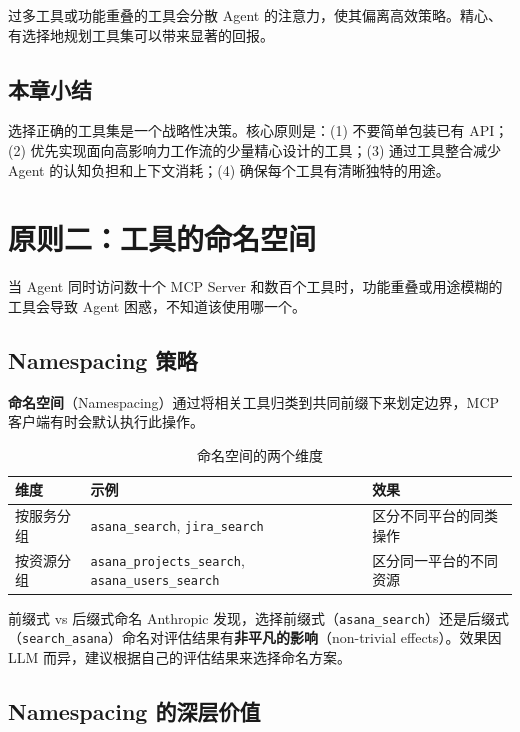 \documentclass[a4paper]{article}
\begin{document}
过多工具或功能重叠的工具会分散 Agent 的注意力，使其偏离高效策略。精心、有选择地规划工具集可以带来显著的回报。

\subsection{本章小结}

选择正确的工具集是一个战略性决策。核心原则是：(1) 不要简单包装已有 API；(2) 优先实现面向高影响力工作流的少量精心设计的工具；(3) 通过工具整合减少 Agent 的认知负担和上下文消耗；(4) 确保每个工具有清晰独特的用途。


\section{原则二：工具的命名空间}

当 Agent 同时访问数十个 MCP Server 和数百个工具时，功能重叠或用途模糊的工具会导致 Agent 困惑，不知道该使用哪一个。

\subsection{Namespacing 策略}

\textbf{命名空间}（Namespacing）通过将相关工具归类到共同前缀下来划定边界，MCP 客户端有时会默认执行此操作。

\begin{table}[H]
\centering
\caption{命名空间的两个维度}
\begin{tabular}{p{}p{}p{}}
\toprule
\textbf{维度} & \textbf{示例} & \textbf{效果} \\
\midrule
按服务分组 & \texttt{asana\_search}, \texttt{jira\_search} & 区分不同平台的同类操作 \\
\midrule
按资源分组 & \texttt{asana\_projects\_search}, \texttt{asana\_users\_search} & 区分同一平台的不同资源 \\
\bottomrule
\end{tabular}
\end{table}

\begin{knowledgebox}{前缀式 vs 后缀式命名}
Anthropic 发现，选择前缀式（\texttt{asana\_search}）还是后缀式（\texttt{search\_asana}）命名对评估结果有\textbf{非平凡的影响}（non-trivial effects）。效果因 LLM 而异，建议根据自己的评估结果来选择命名方案。
\end{knowledgebox}

\subsection{Namespacing 的深层价值}
\end{document}
